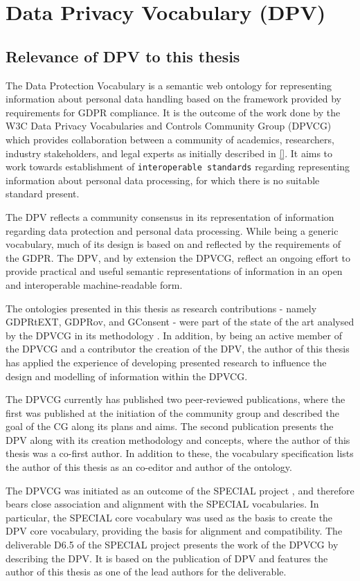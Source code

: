 \section{Data Privacy Vocabulary (DPV)}\label{sec:voc:DPV}
\subsection{Relevance of DPV to this thesis}
The Data Protection Vocabulary is a semantic web ontology for representing information about personal data handling based on the framework provided by requirements for GDPR compliance.
It is the outcome of the work done by the W3C Data Privacy Vocabularies and Controls Community Group (DPVCG) which provides collaboration between a community of academics, researchers, industry stakeholders, and legal experts as initially described in \autoref{}.
It aims to work towards establishment of \texttt{interoperable standards} regarding representing information about personal data processing, for which there is no suitable standard present.

The DPV reflects a community consensus in its representation of information regarding data protection and personal data processing. While being a generic vocabulary, much of its design is based on and reflected by the requirements of the GDPR. The DPV, and by extension the DPVCG, reflect an ongoing effort to provide practical and useful semantic representations of information in an open and interoperable machine-readable form. 

The ontologies presented in this thesis as research contributions - namely GDPRtEXT, GDPRov, and GConsent - were part of the state of the art analysed by the DPVCG in its methodology \cite{}.
In addition, by being an active member of the DPVCG and a contributor the creation of the DPV, the author of this thesis has applied the experience of developing presented research to influence the design and modelling of information within the DPVCG.

The DPVCG currently has published two peer-reviewed publications, where the first \cite{} was published at the initiation of the community group and described the goal of the CG along its plans and aims. The second \cite{} publication presents the DPV along with its creation methodology and concepts, where the author of this thesis was a co-first author.
In addition to these, the vocabulary specification lists the author of this thesis as an co-editor and author of the ontology.

The DPVCG was initiated as an outcome of the SPECIAL project \cite{}, and therefore bears close association and alignment with the SPECIAL vocabularies.
In particular, the SPECIAL core vocabulary was used as the basis to create the DPV core vocabulary, providing the basis for alignment and compatibility.
The deliverable D6.5 \cite{} of the SPECIAL project presents the work of the DPVCG by describing the DPV.
It is based on the publication of DPV \cite{} and features the author of this thesis as one of the lead authors for the deliverable.

